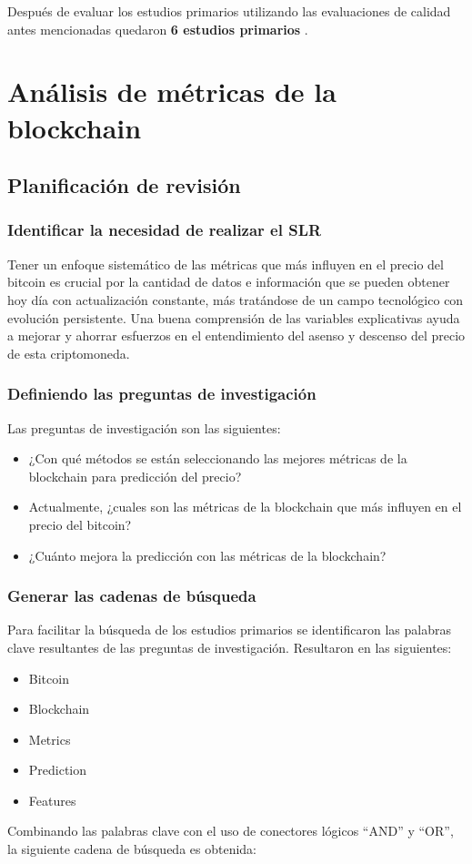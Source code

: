 Después de evaluar los estudios primarios utilizando las evaluaciones de calidad antes mencionadas quedaron \textbf{6 estudios primarios} \cite{tandonBitcoinPriceForecasting2019,chenBitcoinPricePrediction2020,mudassirTimeseriesForecastingBitcoin2020,felizardoComparativeStudyBitcoin2019,mcnallyPredictingPriceBitcoin2018,phaladisailoedMachineLearningModels2018}.

\section{Análisis de métricas de la blockchain}
\subsection{Planificación de revisión}
\subsubsection{Identificar la necesidad de realizar el SLR}

Tener un enfoque sistemático de las métricas que más influyen en el precio del bitcoin es crucial por la cantidad de datos e información que se pueden obtener hoy día con actualización constante, más tratándose de un campo tecnológico con evolución persistente.
Una buena comprensión de las variables explicativas ayuda a mejorar y ahorrar esfuerzos en el entendimiento del asenso y descenso del precio de esta criptomoneda.

\subsubsection{Definiendo las preguntas de investigación}
Las preguntas de investigación son las siguientes:
\begin{itemize}
	\item ¿Con qué métodos se están seleccionando las mejores métricas de la blockchain para predicción del precio?
	\item Actualmente, ¿cuales son las métricas de la blockchain que más influyen en el precio del bitcoin?
	\item ¿Cuánto mejora la predicción con las métricas de la blockchain?
\end{itemize}

\subsubsection{Generar las cadenas de búsqueda}
Para facilitar la búsqueda de los estudios primarios se identificaron las palabras clave resultantes de las preguntas de investigación. Resultaron en las siguientes:
\begin{itemize}
	\item Bitcoin
	\item Blockchain
	\item Metrics
	\item Prediction
	\item Features
\end{itemize}
Combinando las palabras clave con el uso de conectores lógicos “AND” y “OR”, la siguiente cadena de búsqueda es obtenida:\\

